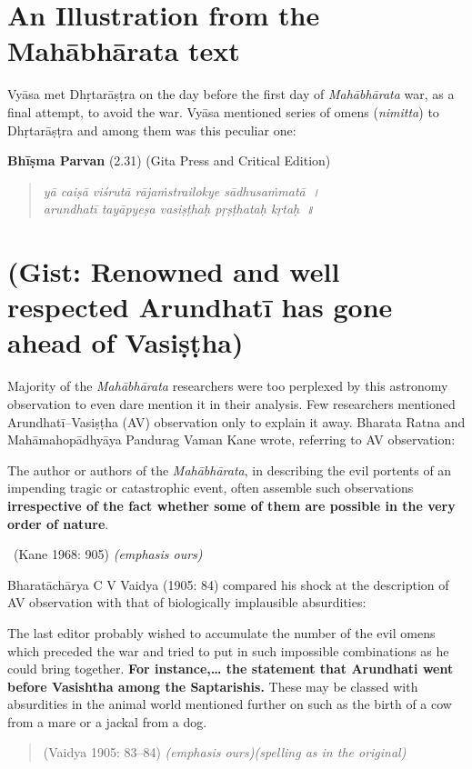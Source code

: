\section*{An Illustration from the Mahābhārata text}

Vyāsa met Dhṛtarāṣṭra on the day before the first day of \textit{Mahābhārata} war, as a final attempt, to avoid the war. Vyāsa mentioned series of omens (\textit{nimitta}) to Dhṛtarāṣṭra and among them was this peculiar one:

\textbf{Bhīṣma Parvan} (2.31) (Gita Press and Critical Edition)

\begin{verse}
\textit{yā caiṣā viśrutā rājaṁstrailokye sādhusaṁmatā~।}\\\textit{arundhatī tayāpyeṣa vasiṣṭhaḥ pṛṣṭhataḥ kṛtaḥ~॥}
\end{verse}


\section*{(Gist: Renowned and well respected Arundhatī has gone ahead of Vasiṣṭha)}

Majority of the \textit{Mahābhārata} researchers were too perplexed by this astronomy observation to even dare mention it in their analysis. Few researchers mentioned Arundhatī–Vasiṣṭha (AV) observation only to explain it away. Bharata Ratna and Mahāmahopādhyāya Pandurag Vaman Kane wrote, referring to AV observation:

\begin{myquote}
The author or authors of the \textit{Mahābhārata}, in describing the evil portents of an impending tragic or catastrophic event, often assemble such observations \textbf{irrespective of the fact whether some of them are possible in the very order of nature}. 

~\hfill (Kane 1968: 905) \textit{(emphasis ours)}
\end{myquote}

Bharatāchārya C V Vaidya (1905: 84) compared his shock at the description of AV observation with that of biologically implausible absurdities:

\begin{myquote}
The last editor probably wished to accumulate the number of the evil omens which preceded the war and tried to put in such impossible combinations as he could bring together. \textbf{For instance,… the statement that Arundhati went before Vasishtha among the Saptarishis.} These may be classed with absurdities in the animal world mentioned further on such as the birth of a cow from a mare or a jackal from a dog. 
\begin{quote}
(Vaidya 1905: 83–84) \textit{(emphasis ours)(spelling as in the original)}
\end{quote}
\end{myquote}

